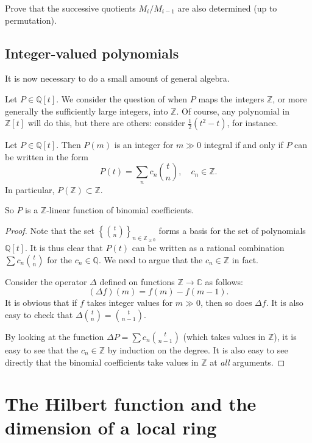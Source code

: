 \begin{exercise} 
Prove that the successive quotients $M_i/M_{i-1}$ are also determined (up to
permutation).
\end{exercise} 

\subsection{Integer-valued polynomials}

It is now necessary to do a small amount of general algebra.

Let $P \in \mathbb{Q}[t]$. We consider the question of when $P$ maps the
integers $\mathbb{Z}$, or more generally the sufficiently large integers, into
$\mathbb{Z}$. Of course, any polynomial in $\mathbb{Z}[t]$ will do this, but
there are others: consider $\frac{1}{2}(t^2 -t)$, for instance.

\begin{proposition}\label{integervalued} 
Let $P \in \mathbb{Q}[t]$. Then $P(m)$ is an integer for $m \gg 0$ integral if and only if
$P$ can be written in the form
\[ P(t) = \sum_n c_n \binom{t}{n}, \quad c_n \in \mathbb{Z}.  \]
In particular, $P(\mathbb{Z}) \subset \mathbb{Z}$.
\end{proposition} 
So $P$ is a $\mathbb{Z}$-linear function of binomial coefficients. 
\begin{proof} 
Note that the set $\left\{\binom{t}{n}\right\}_{n \in \mathbb{Z}_{\geq 0}}$ forms a basis for the set of
polynomials $\mathbb{Q}[t]$. It is thus clear that $P(t)$ can be written as
a rational combination $\sum c_n \binom{t}{n}$ for the $c_n \in \mathbb{Q}$.
We need to argue that the $c_n \in \mathbb{Z}$ in fact.

Consider the operator $\Delta$ defined on functions $\mathbb{Z} \to
\mathbb{C}$ as follows:
\[( \Delta f)(m) = f(m) - f(m-1).  \]
It is obvious that if $f$ takes integer values for $m \gg 0$, then so does
$\Delta f$. It is also easy to check that $\Delta \binom{t}{n} =
\binom{t}{n-1}$.

By looking at the
function $\Delta P = \sum c_n \binom{t}{n-1}$ (which takes values in $\mathbb{Z}$), it is easy to see that the $c_n \in \mathbb{Z}$ by induction
on the degree. 
It is also easy to see directly that the binomial coefficients take values in
$\mathbb{Z}$ at \emph{all} arguments.
\end{proof} 



\section{The Hilbert function and the dimension of a local ring}

